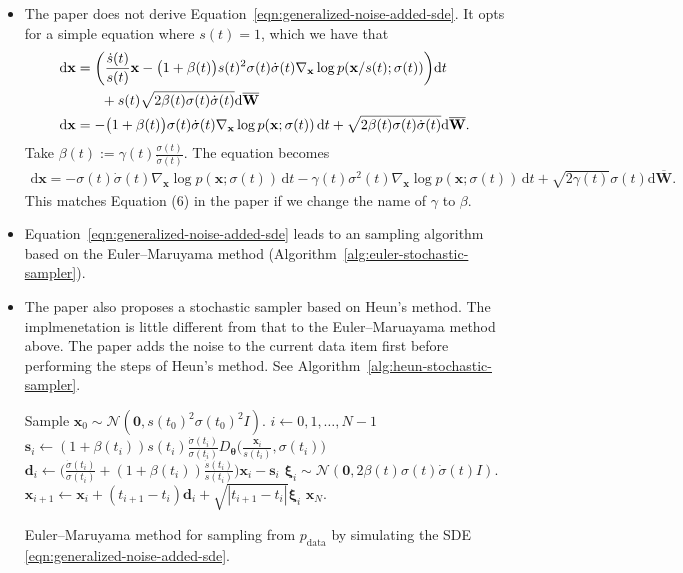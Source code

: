 \documentclass[10pt]{article}
\newcommand{\dee}{\mathrm{d}}
\newcommand{\ve}[1]{\mathbf{#1}}
\newcommand{\ves}[1]{\boldsymbol{#1}}
\newcommand{\mcal}[1]{\mathcal{#1}}
\newcommand{\data}{\mathrm{data}}
\begin{document}
\begin{itemize}
  \item The paper does not derive Equation~\eqref{eqn:generalized-noise-added-sde}. It opts for a simple equation where $s(t) = 1$, which we have that
  \begin{align*}
    \dee\ve{x}
    &= \bigg( \frac{\dot{s}(t)}{s(t)}\ve{x} - \big(1 + \beta(t)\big)s(t)^2 \sigma(t)\dot{\sigma}(t) \nabla_{\ve{x}} \log p(\ve{x}/s(t);\sigma(t)) \bigg) \dee t \notag \\
    &\phantom{=} \quad + s(t) \sqrt{2 \beta(t)\sigma(t)\dot{\sigma}(t)} \dee \overline{\ve{W}} \notag \\
    \dee\ve{x} &=  - \big(1 + \beta(t)\big) \sigma(t)\dot{\sigma}(t) \nabla_{\ve{x}} \log p(\ve{x};\sigma(t))\, \dee t 
    + \sqrt{2 \beta(t)\sigma(t)\dot{\sigma}(t)} \dee \overline{\ve{W}}.
  \end{align*}
  Take $\beta(t) := \gamma(t)\frac{\sigma(t)}{\dot{\sigma}(t)}$. The equation becomes
  \begin{align} \label{eqn:no-scaling-diffusion-sde}
    \dee\ve{x}
    =
    -\sigma(t)\dot{\sigma}(t) \nabla_{\ve{x}} \log p(\ve{x};\sigma(t))\, \dee t - \gamma(t)\sigma^2(t) \nabla_{\ve{x}} \log p(\ve{x};\sigma(t))\, \dee t + \sqrt{2\gamma(t)}\sigma(t) \dee \overline{\ve{W}}.
  \end{align}  
  This matches Equation (6) in the paper if we change the name of $\gamma$ to $\beta$.

  \item Equation~\eqref{eqn:generalized-noise-added-sde} leads to an sampling algorithm based on the Euler--Maruyama method (Algorithm~\ref{alg:euler-stochastic-sampler}).
  
  \item The paper also proposes a stochastic sampler based on Heun's method. The implmenetation is little different from that to the Euler--Maruayama method above. The paper adds the noise to the current data item first before performing the steps of Heun's method. See Algorithm~\ref{alg:heun-stochastic-sampler}.
  
  \begin{algorithm}[t]
  \begin{codebox}
    \Procname{$\proc{Euler-Maruyama-Sampler}(D_{\ves{\theta}}, \sigma, s, \{ t_0, t_1, \dotsc, t_N \} )$}
    \li Sample $\ve{x}_0 \sim \mcal{N}(\ve{0}, s(t_0)^2 \sigma(t_0)^2 I)$.
    \li \For $i \leftarrow 0, 1, \dotsc, N-1$
    \li \Do
          $\ve{s}_i \leftarrow (1 + \beta(t_i)) s(t_i)\frac{\dot{\sigma}(t_i)}{\sigma(t_i)} D_{\ves{\theta}} \Big( \frac{\ve{x}_i}{s(t_i)}, \sigma(t_i)  \Big)$
    \li   $\ve{d}_i \leftarrow \Big( 
            \frac{\dot{\sigma}(t_i)}{\sigma(t_i)} + (1 + \beta(t_i))\frac{\dot{s}(t_i)}{s(t_i)}
          \Big) \ve{x}_i
          - \ve{s}_i$
    \li   $\ves{\xi}_i \sim \mcal{N}(\ve{0}, 2\beta(t)\sigma(t)\dot{\sigma}(t)I)$.
    \li   $\ve{x}_{i+1} \leftarrow \ve{x}_i + (t_{i+1} - t_i)\ve{d}_i + \sqrt{|t_{i+1} - t_i|} \ves{\xi}_i$
        \End
    \li \Return $\ve{x}_N$.
  \end{codebox}
  \caption{Euler--Maruyama method for sampling from $p_{\data}$ by simulating the SDE \eqref{eqn:generalized-noise-added-sde}.}  
  \label{alg:euler-stochastic-sampler}
  \end{algorithm}


\end{itemize}
\end{document}
